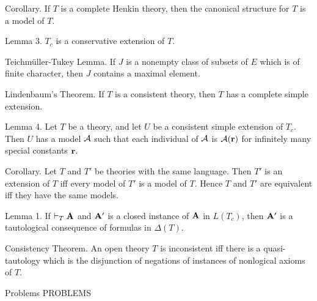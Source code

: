 \proclaim Corollary. If $T$ is a complete Henkin theory, then the canonical
structure for $T$ is a model of $T$.

\proclaim Lemma 3. $T_c$ is a conservative extension of $T$.

\proclaim Teichm\"uller-Tukey Lemma. If $J$ is a nonempty class of subsets of $E$ which is
of finite character, then $J$ contains a maximal element.

\proclaim Lindenbaum's Theorem. If $T$ is a consistent theory, then $T$ has a complete
simple extension.

\proclaim Lemma 4. Let $T$ be a theory, and let $U$ be a consistent simple extension of
$T_c$. Then $U$ has a model ${\cal A}$ such that each individual of ${\cal A}$ is ${\cal A}({\bf r})$ for
infinitely many special constants ${\bf r}$.

\proclaim Corollary. Let $T$ and $T'$ be theories with the same language. Then $T'$ is an
extension of $T$ iff every model of $T'$ is a model of $T$. Hence $T$ and $T'$ are
equivalent iff they have the same models.


\proclaim Lemma 1. If $\vdash_T {\bf A}$ and ${\bf A}'$ is a closed instance of ${\bf A}$ in $L(T_c)$,
then ${\bf A}'$ is a tautological consequence of formulas in $\Delta(T)$.

\proclaim Consistency Theorem. An open theory $T$ is inconsistent iff there is a
quasi-tautology which is the disjunction of negations of instances of nonlogical
axioms of $T$.

 {Problems}
\beginsection PROBLEMS

\vfill
\break
